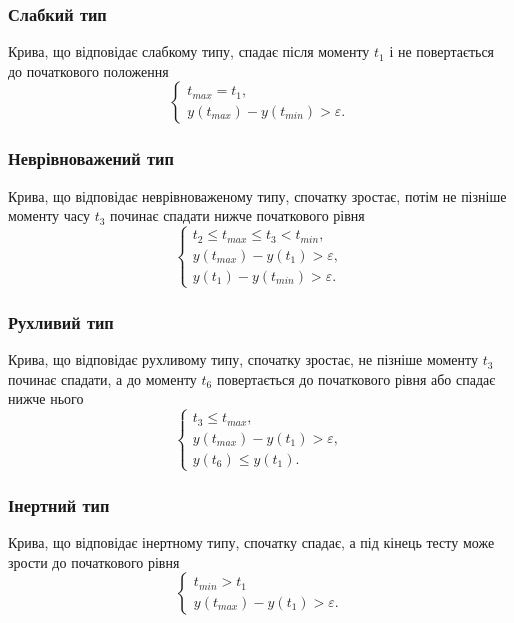 \subsubsection{Слабкий тип}
Крива, що відповідає слабкому типу, спадає після моменту $t_1$
і не повертається до початкового положення
\begin{equation*}
  \begin{cases}
    t_{max} = t_1, \\
    y\left( t_{max} \right) - y\left( t_{min} \right) > \varepsilon.
  \end{cases}
\end{equation*}

\subsubsection{Неврівноважений тип}
Крива, що відповідає неврівноваженому типу, спочатку зростає,
потім не пізніше моменту часу $t_3$ починає спадати нижче початкового рівня
\begin{equation*}
  \begin{cases}
    t_2 \le t_{max} \le t_3 < t_{min}, \\
    y\left( t_{max} \right) - y\left( t_1\right) > \varepsilon, \\
    y\left( t_1 \right) - y\left( t_{min} \right) > \varepsilon.
  \end{cases}
\end{equation*}

\subsubsection{Рухливий тип}
Крива, що відповідає рухливому типу, спочатку зростає,
не пізніше моменту $t_3$ починає спадати,
а до моменту $t_6$ повертається до початкового рівня або спадає нижче нього
\begin{equation*}
  \begin{cases}
    t_3 \le t_{max}, \\
    y\left( t_{max} \right) - y\left( t_1\right) > \varepsilon, \\
    y\left( t_6 \right) \le y\left( t_1 \right).
  \end{cases}
\end{equation*}

\subsubsection{Інертний тип}
Крива, що відповідає інертному типу, спочатку спадає,
а під кінець тесту може зрости до початкового рівня
\begin{equation*}
  \begin{cases}
    t_{min} > t_1 \\
    y\left( t_{max} \right) - y\left( t_1 \right) > \varepsilon.
  \end{cases}
\end{equation*}

